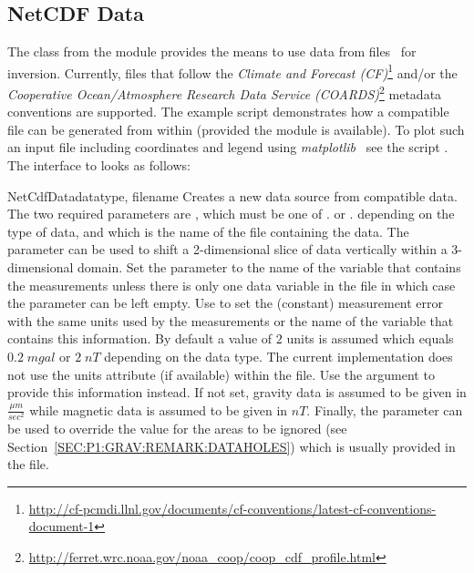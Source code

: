 \subsection{NetCDF Data}\label{sec:ref:DataSource:NETCDF}
The  class from the  module
provides the means to use data from \netcdf files~\cite{NETCDF} for inversion.
Currently, files that follow the \emph{Climate and Forecast (CF)}\footnote{%
\url{http://cf-pcmdi.llnl.gov/documents/cf-conventions/latest-cf-conventions-document-1}}
and/or the \emph{Cooperative Ocean/Atmosphere Research Data Service (COARDS)}\footnote{%
\url{http://ferret.wrc.noaa.gov/noaa_coop/coop_cdf_profile.html}} metadata
conventions are supported.
The example script  demonstrates how a compatible
file can be generated from within \Python (provided the  module
is available).
To plot such an input file including coordinates and legend using
\emph{matplotlib}~\cite{matplotlib} see the script .
The interface to  looks as follows:

\begin{classdesc}{NetCdfData}{datatype, filename%
%
%
%
%
}
Creates a new data source from compatible \netcdf data.
The two required parameters are , which must be one of
. or .
depending on the type of data, and  which is the name of the
file containing the data.
The  parameter can be used to shift a 2-dimensional slice of
data vertically within a 3-dimensional domain.
Set the  parameter to the name of the \netcdf variable
that contains the measurements unless there is only one data variable in the
file in which case the parameter can be left empty.
Use  to set the (constant) measurement error with the same units
used by the measurements or the name of the \netcdf variable that contains this
information. By default a value of $2$ units is assumed which equals
$0.2 \; mgal$ or $2 \; nT$ depending on the data type.
The current implementation does not use the units attribute (if available)
within the \netcdf file. Use the  argument to provide this
information instead.
If not set, gravity data is assumed to be given in $\frac{\mu m}{sec^2}$ while
magnetic data is assumed to be given in $nT$.
Finally, the  parameter can be used to override the value
for the areas to be ignored (see Section~\ref{SEC:P1:GRAV:REMARK:DATAHOLES})
which is usually provided in the \netcdf file.
\end{classdesc}

